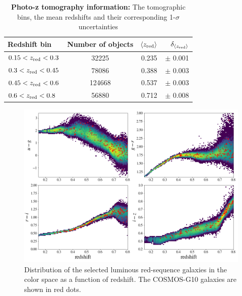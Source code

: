 \documentclass[fleqn,usenatbib,useAMS]{mnras}
\begin{document}
\begin{table}
	\centering
	\caption{{\bf Photo-z tomography information:} 
    The tomographic bins, the mean redshifts and their corresponding 1-$\sigma$ uncertainties}
	
	\label{tab:pz}
	\begin{tabularx}{\columnwidth}{lccr} %
		\hline
		Redshift bin &  Number of objects & $\langle z_{\rm red} \rangle$ & $\delta_{\langle z_{\rm red} \rangle}$ \\
		\hline
		$0.15 <z_{\rm red}<0.3$  & 32225  &  0.235 & $\pm$ 0.001  \\
		$0.3  <z_{\rm red}<0.45$ & 78086  &  0.388 & $\pm$ 0.003  \\
        $0.45 <z_{\rm red}<0.6$  & 124668  &  0.537 & $\pm$ 0.003  \\
        $0.6  <z_{\rm red}<0.8$  & 56880  &  0.712 & $\pm$ 0.008  \\
		\hline
	\end{tabularx}
\end{table}


\begin{figure}
\includegraphics[width=\textwidth]{figures_tmp/cosmos_color.png}
\caption{\label{fig:cosmos_color}Distribution of the selected luminous red-sequence galaxies in 
the color space as a function of redshift. The COSMOS-G10 galaxies are shown in red dots.} 
\end{figure}
\end{document}
